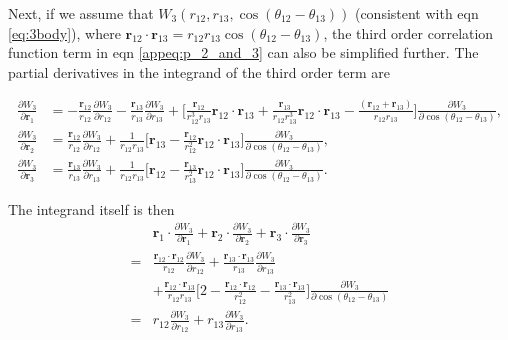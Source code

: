 \documentclass[../main.tex]{subfiles}
\begin{document}
Next, if we assume that $W_3(r_{12},r_{13},\cos(\theta_{12}-\theta_{13}))$
(consistent with eqn \ref{eq:3body}), where
$\bm{r}_{12}\cdot\bm{r}_{13}=r_{12}r_{13}\cos(\theta_{12}-\theta_{13})$,
the third order correlation function term in eqn \ref{appeq:p_2_and_3}
can also be simplified further. The partial derivatives in the integrand
of the third order term are
\begin{widetext}
  \begin{align}
    \frac{\partial W_3}{\partial \bm{r}_1}
    &= -\frac{\bm{r}_{12}}{r_{12}}\frac{\partial W_3}{\partial r_{12}}
    - \frac{\bm{r}_{13}}{r_{13}}\frac{\partial W_3}{\partial r_{13}}
    +\bigg[\frac{\bm{r}_{12}}{r_{12}^3r_{13}}\bm{r}_{12}\cdot\bm{r}_{13}
      +\frac{\bm{r}_{13}}{r_{12}r_{13}^3}\bm{r}_{12}\cdot\bm{r}_{13}
      -\frac{(\bm{r}_{12}+\bm{r}_{13})}{r_{12}r_{13}}\bigg]
    \frac{\partial W_3}{\partial\cos(\theta_{12}-\theta_{13})},\\
    \frac{\partial W_3}{\partial \bm{r}_2}
    &= \frac{\bm{r}_{12}}{r_{12}}\frac{\partial W_3}{\partial r_{12}}
    +\frac{1}{r_{12}r_{13}}\bigg[\bm{r}_{13}-\frac{\bm{r}_{12}}{r_{12}^2}
      \bm{r}_{12}\cdot\bm{r}_{13}\bigg]
    \frac{\partial W_3}{\partial\cos(\theta_{12}-\theta_{13})},\\
    \frac{\partial W_3}{\partial \bm{r}_3}
    &= \frac{\bm{r}_{13}}{r_{13}}\frac{\partial W_3}{\partial r_{13}}
    +\frac{1}{r_{12}r_{13}}\bigg[\bm{r}_{12}-\frac{\bm{r}_{13}}{r_{13}^2}
      \bm{r}_{12}\cdot\bm{r}_{13}\bigg]
    \frac{\partial W_3}{\partial\cos(\theta_{12}-\theta_{13})}.
  \end{align}
\end{widetext}
The integrand itself is then
\begin{align}
  &\bm{r}_1\cdot\frac{\partial W_3}{\partial \bm{r}_1}+
  \bm{r}_2\cdot\frac{\partial W_3}{\partial \bm{r}_2}+
  \bm{r}_3\cdot\frac{\partial W_3}{\partial \bm{r}_3}\nonumber\\
  =&\frac{\bm{r}_{12}\cdot\bm{r}_{12}}{r_{12}}
  \frac{\partial W_3}{\partial r_{12}}+
  \frac{\bm{r}_{13}\cdot\bm{r}_{13}}{r_{13}}
  \frac{\partial W_3}{\partial r_{13}}\nonumber\\
  &+\frac{\bm{r}_{12}\cdot\bm{r}_{13}}{r_{12}r_{13}}\bigg[
    2-\frac{\bm{r}_{12}\cdot\bm{r}_{12}}{r_{12}^2}
    -\frac{\bm{r}_{13}\cdot\bm{r}_{13}}{r_{13}^2}\bigg]
  \frac{\partial W_3}{\partial \cos(\theta_{12}-\theta_{13})}\nonumber\\
  =&r_{12}\frac{\partial W_3}{\partial r_{12}}+
  r_{13}\frac{\partial W_3}{\partial r_{13}}.
\end{align}
\end{document}
